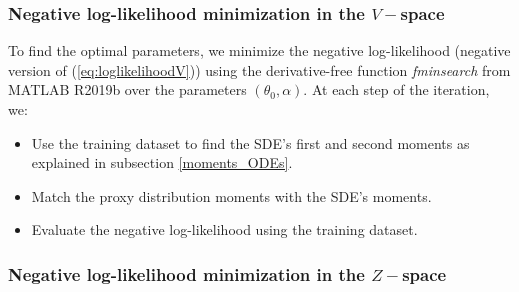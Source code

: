 \documentclass[11pt]{article}
\theoremstyle{definition}
\begin{document}
\subsubsection{Negative log-likelihood minimization in the $V-$space} \label{Sec:MinLH}

To find the optimal parameters, we minimize the negative log-likelihood (negative version of (\ref{eq:loglikelihoodV})) using the derivative-free function \textit{fminsearch} from MATLAB R2019b over the parameters $(\theta_0,\alpha)$. At each step of the iteration, we:
\begin{itemize}

\item Use the training dataset to find the SDE's first and second moments as explained in subsection \ref{moments_ODEs}.
\item Match the proxy distribution moments with the SDE's moments.
\item Evaluate the negative log-likelihood using the training dataset.

\end{itemize}

\subsubsection{Negative log-likelihood minimization in the $Z-$space} \label{Sec:MinLHL}
\end{document}

